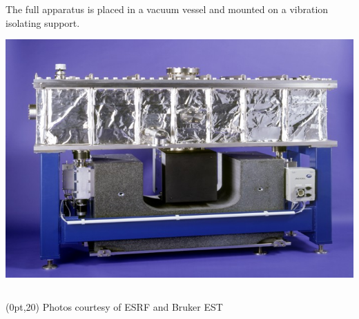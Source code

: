 \documentclass[10pt, xcolor=x11names, compress]{beamer}
\begin{document}
\begin{frame}
\begin{columns}
\begin{column}{0.5\linewidth}
      The full apparatus is placed in a vacuum vessel and mounted on a
      vibration isolating support.
      \begin{center}
        \includegraphics[width=\linewidth]{bl/mirrortank.jpg}
      \end{center} 
    \end{column}
  \end{columns}
  \begin{textblock*}{0.5\linewidth}(0pt,20\TPVertModule)%
    \tiny%
    Photos courtesy of ESRF and Bruker EST
  \end{textblock*}
\end{frame}
\end{document}
